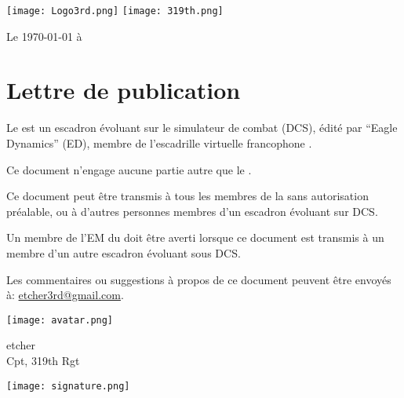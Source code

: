 \thispagestyle{empty}

\noindent\texttt{[image: Logo3rd.png]} \hfill \hfill \texttt{[image: 319th.png]}%

\vfil

\begin{flushright}Le \today{} à \currenttime{}\end{flushright}%

\vfil%

\section*{Lettre de publication}%
%
%

\vfil%



Le \rgt{} est un escadron évoluant sur le simulateur de combat \dcs{} (DCS), édité par ``Eagle Dynamics'' (ED), membre de l'escadrille virtuelle francophone \thirdwing{}.

\vfil%

Ce document n'engage aucune partie autre que le \rgt{}.

\vfil%

Ce document peut être transmis à tous les membres de la \thirdwing{} sans autorisation préalable, ou à d'autres personnes membres d'un escadron évoluant sur DCS.

\vfil%

Un membre de l'EM du \rgt{} doit être averti lorsque ce document est transmis à un membre d'un autre escadron évoluant sous DCS.

\vfil%

Les commentaires ou suggestions à propos de ce document peuvent être envoyés à: \href{mailto:etcher3rd@gmail.com}{etcher3rd@gmail.com}.

\vfil%


\begin{flushright}
    \hfill \parbox{0.3\textwidth}{\raggedright \hfill \texttt{[image: avatar.png]}} \hfil \parbox{0.4\textwidth}{\raggedright etcher \\ Cpt, 319th Rgt \\ \inmem{}}%

\hfill \parbox{0.3\textwidth}{\raggedright \hfill } \hfil \parbox{0.4\textwidth}%
{\centering \texttt{[image: signature.png]}}%
\end{flushright}%

\vfil%
